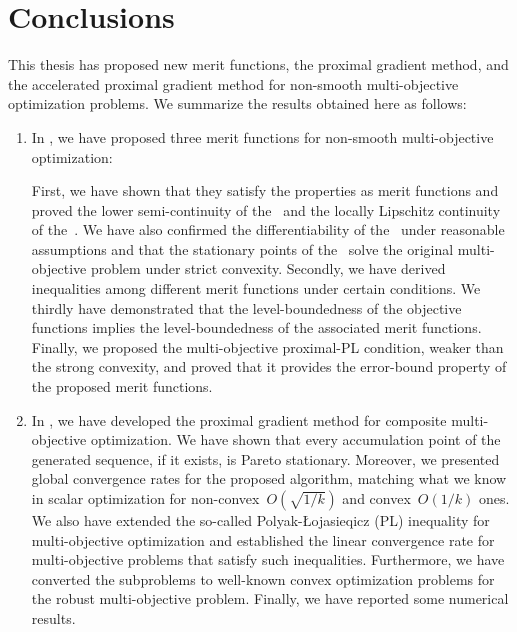 \documentclass[../main]{subfiles}
\begin{document}
\chapter{Conclusions} 
This thesis has proposed new merit functions, the proximal gradient method, and the accelerated proximal gradient method for non-smooth multi-objective optimization problems.
We summarize the results obtained here as follows:
\begin{enumerate}
    \item In , we have proposed three merit functions for non-smooth multi-objective optimization:
        First, we have shown that they satisfy the properties as merit functions and proved the lower semi-continuity of the~ and the locally Lipschitz continuity of the~.
        We have also confirmed the differentiability of the~ under reasonable assumptions and that the stationary points of the~ solve the original multi-objective problem under strict convexity.
        Secondly, we have derived inequalities among different merit functions under certain conditions.
        We thirdly have demonstrated that the level-boundedness of the objective functions implies the level-boundedness of the associated merit functions.
        Finally, we proposed the multi-objective proximal-PL condition, weaker than the strong convexity, and proved that it provides the error-bound property of the proposed merit functions.

    \item In , we have developed the proximal gradient method for composite multi-objective optimization.
        We have shown that every accumulation point of the generated sequence, if it exists, is Pareto stationary.
        Moreover, we presented global convergence rates for the proposed algorithm, matching what we know in scalar optimization for non-convex~$O(\sqrt{1 / k})$ and convex~$O(1 / k)$ ones.
        We also have extended the so-called Polyak-{\L}ojasieqicz (PL) inequality for multi-objective optimization and established the linear convergence rate for multi-objective problems that satisfy such inequalities.
        Furthermore, we have converted the subproblems to well-known convex optimization problems for the robust multi-objective problem.
        Finally, we have reported some numerical results.


\end{enumerate}
\end{document}
